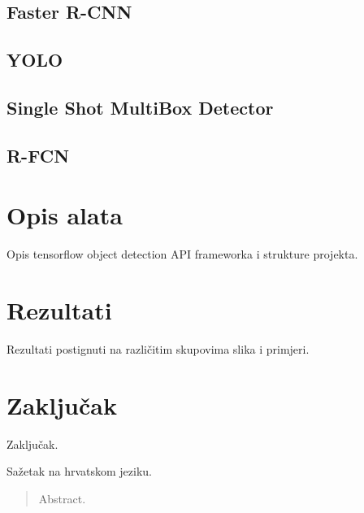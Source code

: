 \documentclass[times, utf8, diplomski]{fer}
\begin{document}
\section{Faster R-CNN}


\section{YOLO}


\section{Single Shot MultiBox Detector}


\section{R-FCN}


\chapter{Opis alata}
Opis tensorflow object detection API frameworka i strukture projekta.

\chapter{Rezultati}
Rezultati postignuti na različitim skupovima slika i primjeri.



\chapter{Zaključak}
Zaključak.





\begin{sazetak}
Sažetak na hrvatskom jeziku.

\end{sazetak}

\begin{abstract}
Abstract.

\end{abstract}
\end{document}
